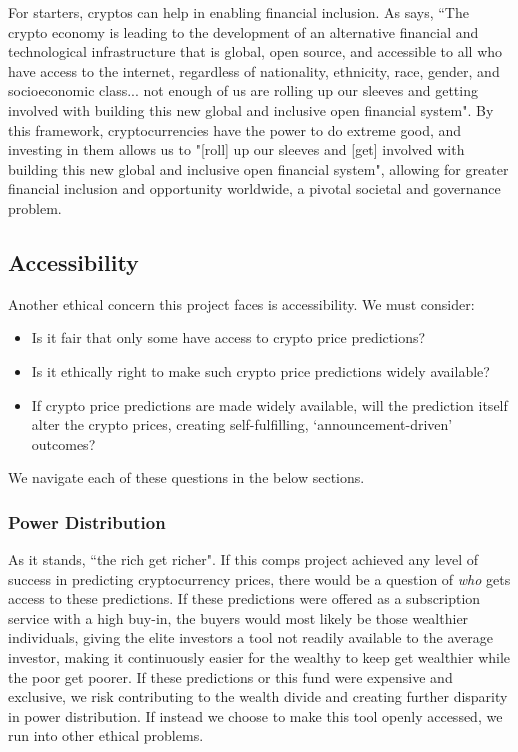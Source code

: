 \documentclass[10pt,twocolumn]{article}
\begin{document}
For starters, cryptos can help in enabling financial inclusion. As  says, ``The crypto economy is leading to the development of an alternative financial and technological infrastructure that is global, open source, and accessible to all who have access to the internet, regardless of nationality, ethnicity, race, gender, and socioeconomic class... not enough of us are rolling up our sleeves and getting involved with building this new global and inclusive open financial system". By this framework, cryptocurrencies have the power to do extreme good, and investing in them allows us to "[roll] up our sleeves and [get] involved with building this new global and inclusive open financial system", allowing for greater financial inclusion and opportunity worldwide, a pivotal societal and governance problem.


\subsection{Accessibility}

Another ethical concern this project faces is accessibility. We must consider:

\begin{itemize}
    \item Is it fair that only some have access to crypto price predictions?
    \item Is it ethically right to make such crypto price predictions widely available?
    \item If crypto price predictions are made widely available, will the prediction itself alter the crypto prices, creating self-fulfilling, `announcement-driven' outcomes?
\end{itemize}

We navigate each of these questions in the below sections.

\subsubsection{Power Distribution}

As it stands, ``the rich get richer". If this comps project achieved any level of success in predicting cryptocurrency prices, there would be a question of \textit{who} gets access to these predictions. If these predictions were offered as a subscription service with a high buy-in, the buyers would most likely be those wealthier individuals, giving the elite investors a tool not readily available to the average investor, making it continuously easier for the wealthy to keep get wealthier while the poor get poorer. If these predictions or this fund were expensive and exclusive, we risk contributing to the wealth divide and creating further disparity in power distribution. If instead we choose to make this tool openly accessed, we run into other ethical problems.
\end{document}

